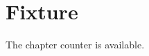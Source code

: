 \documentclass{book}
\begin{document}
\chapter{Fixture}
\begin{apolemma}The chapter counter is available.\end{apolemma}
\end{document}
